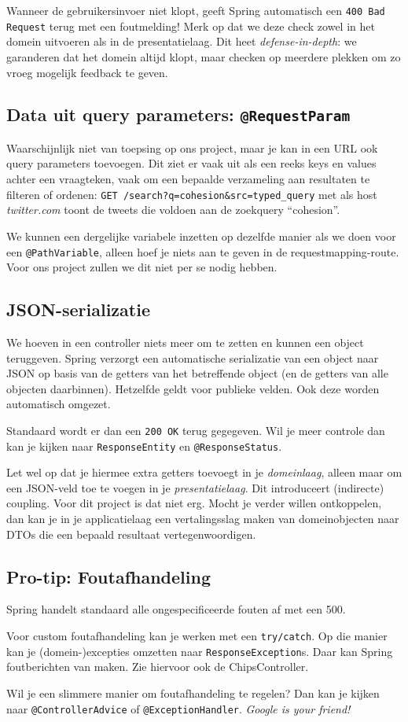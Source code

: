 Wanneer de gebruikersinvoer niet klopt, geeft Spring automatisch 
een \texttt{400 Bad Request} terug met een foutmelding!
Merk op dat we deze check zowel in het domein uitvoeren als in de presentatielaag.
Dit heet \textit{defense-in-depth}: we garanderen dat het domein altijd klopt,
maar checken op meerdere plekken om zo vroeg mogelijk feedback te geven. 

\subsection{Data uit query parameters: \texttt{@RequestParam}}
Waarschijnlijk niet van toepsing op ons project,
maar je kan in een URL ook query parameters toevoegen.
Dit ziet er vaak uit als een reeks keys en values achter een vraagteken,
vaak om een bepaalde verzameling aan resultaten te filteren of ordenen:
\texttt{GET /search?q=cohesion\&src=typed\_query} met als host \textit{twitter.com} 
toont de tweets die voldoen aan de zoekquery ``cohesion''.

We kunnen een dergelijke variabele inzetten op dezelfde manier als we doen voor 
een \texttt{@PathVariable}, alleen hoef je niets aan te geven in de 
requestmapping-route. Voor ons project zullen we dit niet per se nodig hebben.

\subsection{JSON-serializatie}
We hoeven in een controller niets meer om te zetten en kunnen een object 
teruggeven. Spring verzorgt een automatische serializatie van een object naar JSON
op basis van de getters van het betreffende object (en de getters van alle objecten daarbinnen).
Hetzelfde geldt voor publieke velden. Ook deze worden automatisch omgezet.

Standaard wordt er dan een \texttt{200 OK} terug gegegeven.
Wil je meer controle dan kan je kijken naar \texttt{ResponseEntity}
en \texttt{@ResponseStatus}.

Let wel op dat je hiermee extra getters toevoegt in je \textit{domeinlaag}, alleen maar 
om een JSON-veld toe te voegen in je \textit{presentatielaag}. Dit introduceert (indirecte)
coupling. Voor dit project is dat niet erg. Mocht je verder willen ontkoppelen, dan kan je 
in je applicatielaag een vertalingsslag maken van domeinobjecten naar DTOs die een bepaald 
resultaat vertegenwoordigen.

\subsection{Pro-tip: Foutafhandeling}
Spring handelt standaard alle ongespecificeerde fouten af met een 500.

Voor custom foutafhandeling kan je werken met een \texttt{try/catch}. 
Op die manier kan je (domein-)excepties omzetten naar
\texttt{ResponseException}s. Daar kan Spring foutberichten van maken.
Zie hiervoor ook de ChipsController.

Wil je een slimmere manier om foutafhandeling te regelen? Dan kan je 
kijken naar \texttt{@ControllerAdvice} of \texttt{@ExceptionHandler}.
\textit{Google is your friend!}
